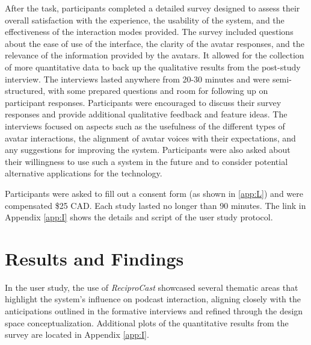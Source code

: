 \documentclass[12pt]{report}
\begin{document}
\begin{myfont}
        \indent After the task, participants completed a detailed survey designed to assess their overall satisfaction with the experience, the usability of the system, and the effectiveness of the interaction modes provided. The survey included questions about the ease of use of the interface, the clarity of the avatar responses, and the relevance of the information provided by the avatars. It allowed for the collection of more quantitative data to back up the qualitative results from the post-study interview. The interviews lasted anywhere from 20-30 minutes and were semi-structured, with some prepared questions and room for following up on participant responses. Participants were encouraged to discuss their survey responses and provide additional qualitative feedback and feature ideas. The interviews focused on aspects such as the usefulness of the different types of avatar interactions, the alignment of avatar voices with their expectations, and any suggestions for improving the system. Participants were also asked about their willingness to use such a system in the future and to consider potential alternative applications for the technology.

        \indent Participants were asked to fill out a consent form (as shown in \ref{app:L}) and were compensated \$25 CAD. Each study lasted no longer than 90 minutes. The link in Appendix \ref{app:I} shows the details and script of the user study protocol.
        
        \section{Results and Findings}
        In the user study, the use of \textit{ReciproCast} showcased several thematic areas that highlight the system's influence on podcast interaction, aligning closely with the anticipations outlined in the formative interviews and refined through the design space conceptualization. Additional plots of the quantitative results from the survey are located in Appendix \ref{app:I}.


\end{myfont}
\end{document}
